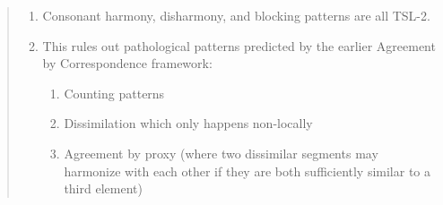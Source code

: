 
\begin{abstract}
\begin{enumerate}
  \item Consonant harmony, disharmony, and blocking patterns are all TSL-2.
  \item This rules out pathological patterns predicted by the earlier Agreement by Correspondence framework:
  \begin{enumerate}
    \item Counting patterns
    \item Dissimilation which only happens non-locally
    \item Agreement by proxy (where two dissimilar segments may harmonize with each other if they are both sufficiently similar to a third element)
  \end{enumerate}
\end{enumerate}
\end{abstract}
